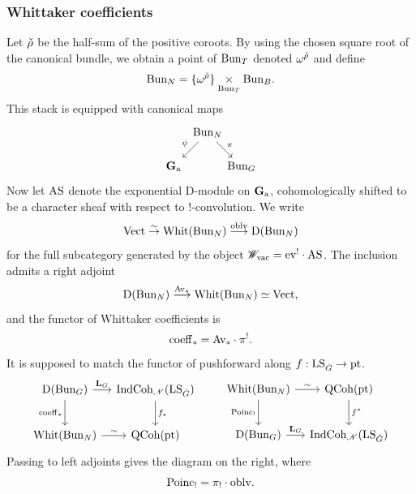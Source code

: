 \subsubsection{Whittaker coefficients} Let ${\check{\rho}}$ be the half-sum of the positive coroots. By using the chosen square root of the canonical bundle, we obtain a point of $\mathrm{Bun}_T$ denoted $\omega^{\check{\rho}}$ and define
    \[
    \mathrm{Bun}_N = \{\omega^{\check{\rho}}\} \underset{\mathrm{Bun}_T}{\times} \mathrm{Bun}_B.
    \]
This stack is equipped with canonical maps
    \[
    \begin{tikzcd}[
  column sep={3em,between origins},
  row sep={3em,between origins}
]
      & \Bun_N \arrow[dl, "\psi" above left] \arrow[dr, "\pi"] & \\
      \Ga & & \Bun_G
    \end{tikzcd}
    \]
Now let $\mathrm{AS}$ denote the exponential D-module on $\mathbf{G}_{\mathrm{a}}$, cohomologically shifted to be a character sheaf with respect to $!$-convolution. We write
    \[\mathrm{Vect} \overset{\sim}{\rightarrow} \mathrm{Whit}(\mathrm{Bun}_N) \overset{\mathrm{oblv}}{\longrightarrow} \mathrm{D}(\mathrm{Bun}_N)\]
for the full subcategory generated by the object $\mathscr{W}_{\mathrm{vac}} = \mathrm{ev}^! \cdot \mathrm{AS}$. The inclusion admits a right adjoint
    \[
    \mathrm{D}(\mathrm{Bun}_N) \overset{\mathrm{Av}_*}{\longrightarrow} \mathrm{Whit}(\mathrm{Bun}_N) \simeq \mathrm{Vect},
    \]
and the functor of Whittaker coefficients is
    \[
    \mathrm{coeff}_* = \mathrm{Av}_* \cdot \pi^!.
    \]
It is supposed to match the functor of pushforward along $f : \mathrm{LS}_{\check{G}} \to \mathrm{pt}$.
\begin{equation}
\label{eqn:L_G_coeff_Poinc}
\begin{tikzcd}[
  column sep={8em,between origins},
  row sep={4em,between origins}
]
  \DMod(\Bun_G) \arrow[d, "\coeff_*" left] \arrow[r, "\GLL_G"] & \ICoh_\Nilp(\LS_\LG) \arrow[d, "f_*"] \\
  \Whit(\Bun_N) \arrow[r, "\sim"] & \QCoh(\pt)
\end{tikzcd}
\qquad
\begin{tikzcd}[
  column sep={8em,between origins},
  row sep={4em,between origins}
]
    \Whit(\Bun_N) \arrow[r, "\sim"] \arrow[d, "\Poinc_!" left] & \QCoh(\pt) \arrow[d, "f^*"] \\ 
    \DMod(\Bun_G) \arrow[r, "\GLL_G"] & \ICoh_\Nilp(\LS_\LG)
\end{tikzcd}
\end{equation}
Passing to left adjoints gives the diagram on the right, where
    \[\mathrm{Poinc}_! = \pi_! \cdot \mathrm{oblv}.\]


